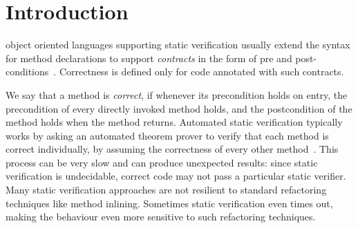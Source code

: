 \section{Introduction}

object oriented languages supporting static verification usually extend the syntax for method declarations
to support \emph{contracts} in the form of pre and post-conditions~\cite{Meyer:1988:OSC:534929}.
Correctness is defined only for code annotated with such contracts.

We say that a method is \emph{correct}, if whenever its precondition holds on entry, the precondition of every directly invoked method holds, and the postcondition of the method holds when the method returns. Automated static verification typically works by asking an automated theorem prover to verify that each method is correct individually, by assuming the correctness of every other method~\cite{barnett2004spec}. This process can be very slow and can produce unexpected results: since static verification is undecidable, correct code may not pass a particular static verifier.
Many static verification approaches are not resilient to
standard refactoring techniques like 
method inlining. Sometimes static verification even times out, making the behaviour even more sensitive to such refactoring techniques.



